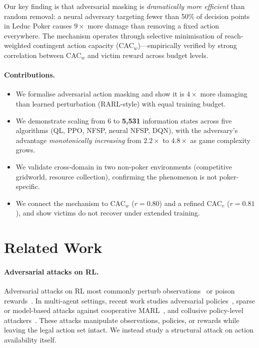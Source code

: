 \documentclass{article}
\begin{document}
Our key finding is that adversarial masking is \emph{dramatically more efficient} than random removal: a neural adversary targeting fewer than 50\% of decision points in Leduc Poker causes $9\times$ more damage than removing a fixed action everywhere. The mechanism operates through selective minimisation of reach-weighted contingent action capacity (CAC$_w$)---empirically verified by strong correlation between CAC$_w$ and victim reward across budget levels.

\paragraph{Contributions.}
\begin{itemize}
  \item We formalise adversarial action masking and show it is $4\times$ more damaging than learned perturbation (RARL-style) with equal training budget.
  \item We demonstrate scaling from 6 to \textbf{5,531} information states across five algorithms (QL, PPO, NFSP, neural NFSP, DQN), with the adversary's advantage \emph{monotonically increasing} from $2.2\times$ to $4.8\times$ as game complexity grows.
  \item We validate cross-domain in two non-poker environments (competitive gridworld, resource collection), confirming the phenomenon is not poker-specific.
  \item We connect the mechanism to CAC$_w$ ($r = 0.80$) and a refined CAC$_v$ ($r = 0.81$), and show victims do not recover under extended training.
\end{itemize}

\section{Related Work}

\paragraph{Adversarial attacks on RL.}
Adversarial attacks on RL most commonly perturb observations~\citep{huang2017adversarial,gleave2020adversarial,zhang2021robust,sun2022who} or poison rewards~\citep{zhang2020adaptive}. In multi-agent settings, recent work studies adversarial policies~\citep{gleave2020adversarial}, sparse or model-based attacks against cooperative MARL~\citep{lin2020marlrobust,hu2022sparse}, and collusive policy-level attackers~\citep{niu2026cama}. These attacks manipulate observations, policies, or rewards while leaving the legal action set intact. We instead study a structural attack on action availability itself.
\end{document}
